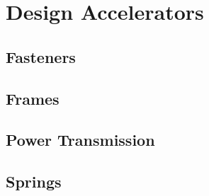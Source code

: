 \section{Design Accelerators}

\subsection{Fasteners}

\subsection{Frames}

\subsection{Power Transmission}

\subsection{Springs}